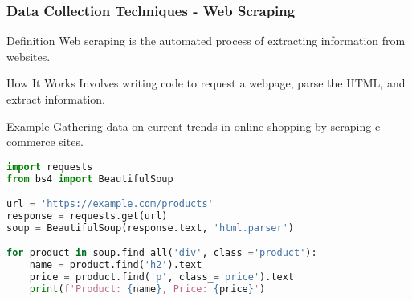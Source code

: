 \documentclass[aspectratio=169]{beamer}
\begin{document}
\begin{frame}[fragile]
    \frametitle{Data Collection Techniques - Web Scraping}
    \begin{block}{Definition}
        Web scraping is the automated process of extracting information from websites.
    \end{block}
    \begin{block}{How It Works}
        Involves writing code to request a webpage, parse the HTML, and extract information.
    \end{block}
    \begin{exampleblock}{Example}
        Gathering data on current trends in online shopping by scraping e-commerce sites.
    \end{exampleblock}
    \begin{lstlisting}[language=Python]
import requests
from bs4 import BeautifulSoup

url = 'https://example.com/products'
response = requests.get(url)
soup = BeautifulSoup(response.text, 'html.parser')

for product in soup.find_all('div', class_='product'):
    name = product.find('h2').text
    price = product.find('p', class_='price').text
    print(f'Product: {name}, Price: {price}')
    \end{lstlisting}
\end{frame}
\end{document}
